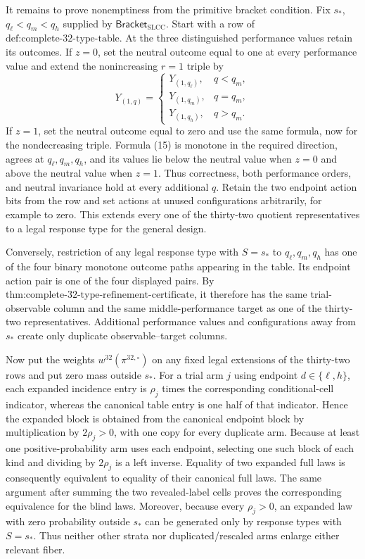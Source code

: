 It remains to prove nonemptiness from the primitive bracket condition.  Fix \(s_*\), \(q_\ell<q_m<q_h\) supplied by \(\mathsf{Bracket}_{\mathrm{SLCC}}\).  Start with a row of \(\text{def:complete-32-type-table}\).  At the three distinguished performance values retain its outcomes.  If \(z=0\), set the neutral outcome equal to one at every performance value and extend the nonincreasing \(r=1\) triple by
\[
Y_{(1,q)}=
\begin{cases}
Y_{(1,q_\ell)},&q<q_m,\\
Y_{(1,q_m)},&q=q_m,\\
Y_{(1,q_h)},&q>q_m.
\end{cases}
\tag{15}
\]
If \(z=1\), set the neutral outcome equal to zero and use the same formula, now for the nondecreasing triple.  Formula (15) is monotone in the required direction, agrees at \(q_\ell,q_m,q_h\), and its values lie below the neutral value when \(z=0\) and above the neutral value when \(z=1\).  Thus correctness, both performance orders, and neutral invariance hold at every additional \(q\).  Retain the two endpoint action bits from the row and set actions at unused configurations arbitrarily, for example to zero.  This extends every one of the thirty-two quotient representatives to a legal response type for the general design.

Conversely, restriction of any legal response type with \(S=s_*\) to \(q_\ell,q_m,q_h\) has one of the four binary monotone outcome paths appearing in the table.  Its endpoint action pair is one of the four displayed pairs.  By \(\text{thm:complete-32-type-refinement-certificate}\), it therefore has the same trial-observable column and the same middle-performance target as one of the thirty-two representatives.  Additional performance values and configurations away from \(s_*\) create only duplicate observable--target columns.

Now put the weights \(w^{32}(\pi^{32,\circ})\) on any fixed legal extensions of the thirty-two rows and put zero mass outside \(s_*\).  For a trial arm \(j\) using endpoint \(d\in\{\ell,h\}\), each expanded incidence entry is \(\rho_j\) times the corresponding conditional-cell indicator, whereas the canonical table entry is one half of that indicator.  Hence the expanded block is obtained from the canonical endpoint block by multiplication by \(2\rho_j>0\), with one copy for every duplicate arm.  Because at least one positive-probability arm uses each endpoint, selecting one such block of each kind and dividing by \(2\rho_j\) is a left inverse.  Equality of two expanded full laws is consequently equivalent to equality of their canonical full laws.  The same argument after summing the two revealed-label cells proves the corresponding equivalence for the blind laws.  Moreover, because every \(\rho_j>0\), an expanded law with zero probability outside \(s_*\) can be generated only by response types with \(S=s_*\).  Thus neither other strata nor duplicated/rescaled arms enlarge either relevant fiber.

